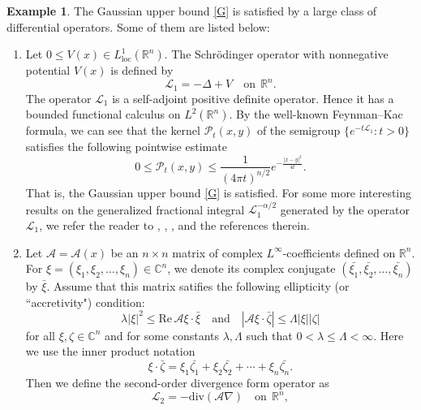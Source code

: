 \documentclass[10pt, reqno]{amsart}
\theoremstyle{definition}
\newtheorem{example}[theorem]{Example}
\theoremstyle{remark}
\numberwithin{equation}{section}
\begin{document}
\begin{example}
The Gaussian upper bound \eqref{G} is satisfied by a large class of differential operators. Some of them are listed below:
\begin{enumerate}
\item Let $0\leq V(x)\in L^1_{\mathrm{loc}}(\mathbb R^n)$. The Schr\"{o}dinger operator with nonnegative potential $V(x)$ is defined by
\begin{equation*}
\mathcal{L}_1=-\Delta+V \quad \mbox{on}~~ \mathbb R^n.
\end{equation*}
The operator $\mathcal{L}_1$ is a self-adjoint positive definite operator. Hence it has a bounded functional calculus on $L^2(\mathbb R^n)$. By the well-known Feynman--Kac formula, we can see that the kernel $\mathcal{P}_t(x,y)$ of the semigroup $\big\{e^{-t\mathcal L_1}:t>0\big\}$ satisfies the following pointwise estimate
\begin{equation*}
0\leq \mathcal{P}_t(x,y)\leq\frac{1}{(4\pi t)^{n/2}}e^{-\frac{|x-y|^2}{4t}}.
\end{equation*}
That is, the Gaussian upper bound \eqref{G} is satisfied. For some more interesting results on the generalized fractional integral $\mathcal{L}_1^{-\alpha/2}$ generated by the operator $\mathcal{L}_1$,
we refer the reader to \cite{ak}, \cite{bui}, \cite{tang}, \cite{wang} and the references therein.
\item Let $\mathcal{A}=\mathcal{A}(x)$ be an $n\times n$ matrix of complex $L^{\infty}$-coefficients defined on $\mathbb R^n$. For $\xi=(\xi_1,\xi_2,\dots,\xi_n)\in \mathbb{C}^n$, we denote its complex conjugate $(\bar{\xi_1},\bar{\xi_2},\dots,\bar{\xi_n})$ by $\bar{\xi}$. Assume that this matrix satifies the following ellipticity (or ``accretivity") condition:
\begin{equation*}
\lambda|\xi|^2\leq \mathrm{Re}\, \mathcal{A}\xi\cdot\bar{\xi}\quad \mbox{and} \quad |\mathcal{A}\xi\cdot\bar{\zeta}|\leq\Lambda|\xi||\zeta|
\end{equation*}
for all $\xi,\zeta\in \mathbb{C}^n$ and for some constants $\lambda,\Lambda$ such that $0<\lambda\leq\Lambda<\infty$. Here we use the inner product notation
\begin{equation*}
\xi\cdot\bar{\zeta}=\xi_1\bar{\zeta_1}+\xi_2\bar{\zeta_2}+\cdots+\xi_n\bar{\zeta_n}.
\end{equation*}
Then we define the second-order divergence form operator as
\begin{equation*}
\mathcal{L}_2=-\mathrm{div}(\mathcal{A}\nabla)\quad \mbox{on}~~ \mathbb R^n,

\end{equation*}
\end{enumerate}
\end{example}
\end{document}
